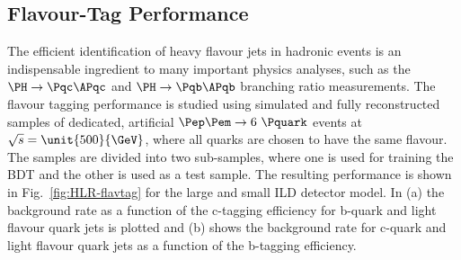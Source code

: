 \subsection{Flavour-Tag Performance}
\label{sec:perf:hlr:lcfi}
The efficient identification of heavy flavour jets in hadronic events is an indispensable ingredient to many important physics analyses, such as
the $\PH\rightarrow\Pqc\APqc$ and $\PH\rightarrow\Pqb\APqb$ branching ratio  measurements.
The flavour tagging performance is studied using simulated and fully reconstructed samples
of dedicated, artificial $\Pep \Pem \rightarrow 6~\Pquark$ events at $\sqrt{s}=\unit{500}{\GeV}$, where all quarks are chosen to have the same flavour.
The samples are divided into two sub-samples, where one is used for training the BDT and the other is used
as a test sample. The resulting performance is shown in Fig.~\ref{fig:HLR-flavtag} for the large and small ILD detector model.
In (a) the background rate as a function of the c-tagging efficiency for b-quark and light flavour quark jets is plotted and (b) shows the
 background rate for c-quark and light flavour quark jets as a function of the b-tagging efficiency.
%
